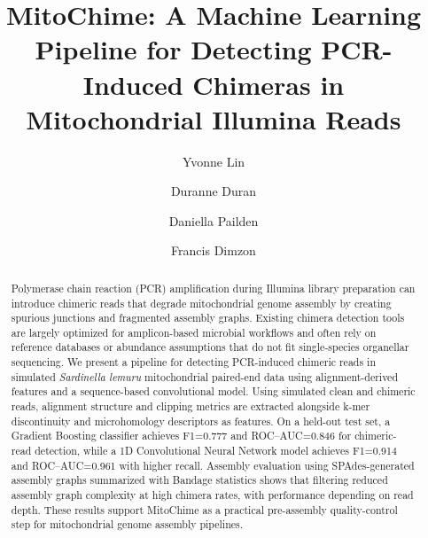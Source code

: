 \documentclass[runningheads]{llncs}
\newif\ifanonymized
\begin{document}
\title{MitoChime: A Machine Learning Pipeline for Detecting PCR-Induced Chimeras in Mitochondrial Illumina Reads}

\ifanonymized
  \author{X X X X X}
  \authorrunning{X}
  \institute{X}
\else
  \author{Yvonne Lin \and Duranne Duran \and Daniella Pailden \and Francis Dimzon}
\fi

\maketitle

\begin{abstract}
Polymerase chain reaction (PCR) amplification during Illumina library preparation can introduce chimeric reads that degrade mitochondrial genome assembly by creating spurious junctions and fragmented assembly graphs. Existing chimera detection tools are largely optimized for amplicon-based microbial workflows and often rely on reference databases or abundance assumptions that do not fit single-species organellar sequencing. We present a pipeline for detecting PCR-induced chimeric reads in simulated \textit{Sardinella lemuru} mitochondrial paired-end data using alignment-derived features and a sequence-based convolutional model. Using simulated clean and chimeric reads, alignment structure and clipping metrics are extracted alongside k-mer discontinuity and microhomology descriptors as features. On a held-out test set, a Gradient Boosting classifier achieves F1=0.777 and ROC--AUC=0.846 for chimeric-read detection, while a 1D Convolutional Neural Network model achieves F1=0.914 and ROC--AUC=0.961 with higher recall. Assembly evaluation using SPAdes-generated assembly graphs summarized with Bandage statistics shows that 
filtering reduced assembly graph complexity at high chimera rates, with performance depending on read depth. These results support MitoChime as a practical pre-assembly quality-control step for mitochondrial genome assembly pipelines.
\end{abstract}







\end{document}
